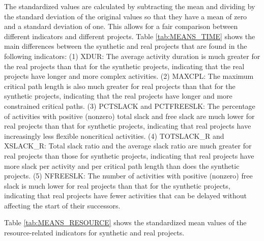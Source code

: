 \documentclass[preprint,
3p]{elsarticle} %
\begin{document}
The standardized values are calculated by subtracting the mean and
dividing by the standard deviation of the original values so that they
have a mean of zero and a standard deviation of one. This allows for a
fair comparison between different indicators and different projects.
Table \ref{tab:MEANS_TIME} shows the main differences between the
synthetic and real projects that are found in the following indicators:
(1) XDUR: The average activity duration is much greater for the real
projects than that for the synthetic projects, indicating that the real
projects have longer and more complex activities. (2) MAXCPL: The
maximum critical path length is also much greater for real projects than
that for the synthetic projects, indicating that the real projects have
longer and more constrained critical paths. (3) PCTSLACK and PCTFREESLK:
The percentage of activities with positive (nonzero) total slack and
free slack are much lower for real projects than that for synthetic
projects, indicating that real projects have increasingly less flexible
noncritical activities. (4) TOTSLACK\_R and XSLACK\_R: Total slack ratio
and the average slack ratio are much greater for real projects than
those for synthetic projects, indicating that real projects have more
slack per activity and per critical path length than does the synthetic
projects. (5) NFREESLK: The number of activities with positive (nonzero)
free slack is much lower for real projects than that for the synthetic
projects, indicating that real projects have fewer activities that can
be delayed without affecting the start of their successors.

Table \ref{tab:MEANS_RESOURCE} shows the standardized mean values of the
resource-related indicators for synthetic and real projects.
\end{document}
